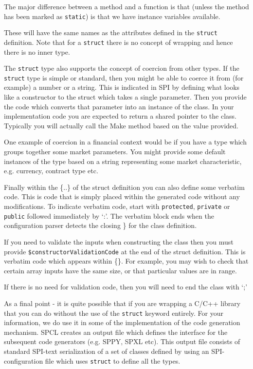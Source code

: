 The major difference between a method and a function is that (unless the method has been marked as \texttt{static}) is that we have instance variables available.

These will have the same names as the attributes defined in the \texttt{struct} definition.
Note that for a \texttt{struct} there is no concept of wrapping and hence there is no inner type.

The \texttt{struct} type also supports the concept of coercion from other types.
If the \texttt{struct} type is simple or standard, then you might be able to coerce it from (for example) a number or a string.
This is indicated in SPI by defining what looks like a constructor to the struct which takes a single parameter.
Then you provide the code which converts that parameter into an instance of the class.
In your implementation code you are expected to return a shared pointer to the class.
Typically you will actually call the Make method based on the value provided.

One example of coercion in a financial context would be if you have a type which groups together some market parameters.
You might provide some default instances of the type based on a string representing some market characteristic, e.g. currency, contract type etc.

Finally within the \{..\} of the struct definition you can also define some verbatim code.
This is code that is simply placed within the generated code without any modifications.
To indicate verbatim code, start with \texttt{protected}, \texttt{private} or \texttt{public} followed immediately by `:'.
The verbatim block ends when the configuration parser detects the closing \} for the class definition.

If you need to validate the inputs when constructing the class then you must provide \texttt{\$constructorValidationCode} at the end of the struct definition.
This is verbatim code which appears within \{\}.
For example, you may wish to check that certain array inputs have the same size, or that particular values are in range.

If there is no need for validation code, then you will need to end the class with `;'

As a final point - it is quite possible that if you are wrapping a C/C++ library that you can do without the use of the \texttt{struct} keyword entirely.
For your information, we do use it in some of the implementation of the code generation mechanism.
SPCL creates an output file which defines the interface for the subsequent code generators (e.g. SPPY, SPXL etc).
This output file consists of standard SPI-text serialization of a set of classes defined by using an SPI-configuration file which uses \texttt{struct} to define all the types.


